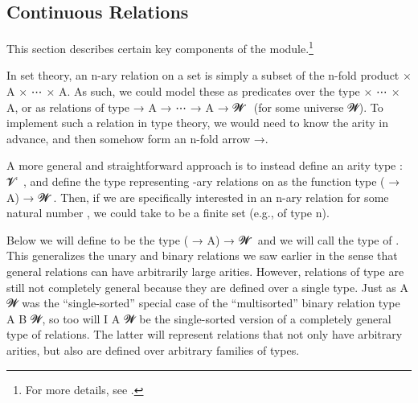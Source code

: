 \documentclass[a4paper,UKenglish,cleveref,autoref,thm-restate,11pt]{lipics-v2021}
\begin{document}












\subsection{Continuous Relations}\label{continuous-relations}
This section describes certain key components of the \ualibContinuous module.\footnote{For more details, see \urlContinuous.}


In set theory, an \ab n-ary relation on a set  is simply a subset of the \ab n-fold product  \ad × \ab A \ad × \as ⋯ \ad × \ab A. As such, we could model these as predicates over the type  \ad × \as ⋯ \ad × \ab A, or as relations of type  \as → \ab A \as → \as ⋯ \as → \ab A \as → \ab 𝓦 \af ̇~(for some universe \ab 𝓦). To implement such a relation in type theory, we would need to know the arity in advance, and then somehow form an \ab n-fold arrow \as →.

A more general and straightforward approach is to instead define an arity type  \as : \ab 𝓥 \af ̇ , and define the type representing -ary relations on  as the function type ( \as → \ab A) \as → \ab 𝓦 \af ̇. Then, if we are specifically interested in an \ab n-ary relation for some natural number , we could take  to be a finite set (e.g., of type  n).

Below we will define  to be the type ( \as → \ab A) \as → \ab 𝓦 \af ̇ and we will call  the type of . This generalizes the unary and binary relations we saw earlier in the sense that general relations can have arbitrarily large arities. However, relations of type  are still not completely general because they are defined over a single type. Just as  \ab A \ab 𝓦 was the ``single-sorted'' special case of the ``multisorted'' binary relation type  \ab A \ab B \ab 𝓦, so too will  \ab I \ab A \ab 𝓦 be the single-sorted version of a completely general type of relations. The latter will represent relations that not only have arbitrary arities, but also are defined over arbitrary families of types.
\end{document}
